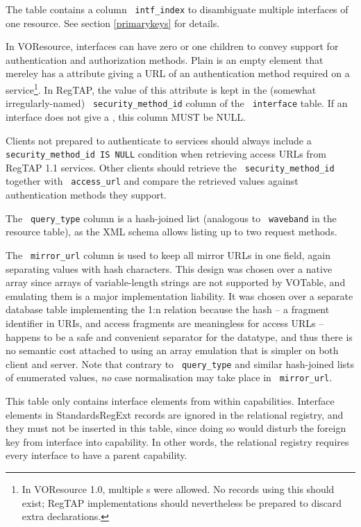 \documentclass[11pt,a4paper]{ivoa}
\newcommand{\rtent}[1]{\texttt{\color{rtcolor} #1}}
\begin{document}
The table contains a column \rtent{intf\_index} to disambiguate
multiple interfaces of one resource. See section \ref{primarykeys} for details.

In VOResource, interfaces can have zero or one 
children to convey support for authentication and authorization methods.
Plain  is an empty element that mereley has a
 attribute giving a URL of an authentication method
required on a service\footnote{In VOResource 1.0, multiple
s were allowed.  No records using this should
exist; RegTAP implementations should nevertheless be prepared to discard
extra  declarations.}.  In RegTAP, the value of
this attribute is kept in the (somewhat irregularly-named)
\rtent{security\_method\_id} column of the \rtent{interface} table.  If
an interface does not give a , this column MUST
be NULL.

Clients not prepared to authenticate to services should always include a
\verb|security_method_id IS NULL| condition when retrieving access URLs
from RegTAP 1.1 services.  Other clients should retrieve the
\rtent{security\_method\_id} together with \rtent{access\_url} and
compare the retrieved values against authentication methods they
support.

The \rtent{query\_type} column is a hash-joined list (analogous
to \rtent{waveband} in the resource table), as
the XML schema allows listing up to two request methods.

The \rtent{mirror\_url} column is used to keep all mirror URLs in one
field, again separating values with hash characters.  This design was
chosen over a native array since arrays of variable-length strings are
not supported by VOTable, and emulating them is a major implementation
liability.  It was chosen over a separate database table implementing
the 1:n relation because the hash -- a fragment identifier in URIs, and
access fragments are meaningless for access URLs -- happens to be a safe and
convenient separator for the datatype, and thus there is no semantic
cost attached to using an array emulation that is simpler on both client
and server.  Note that contrary to \rtent{query\_type} and similar
hash-joined lists of enumerated values, \emph{no} case normalisation
may take place in \rtent{mirror\_url}.

This table only contains interface elements from within capabilities.
Interface elements in StandardsRegExt records are ignored in the
relational registry,
and they must not be inserted in this table, since doing so would disturb
the foreign key from interface into capability.  In other words,
the relational registry requires every interface to have a parent capability.
\end{document}
